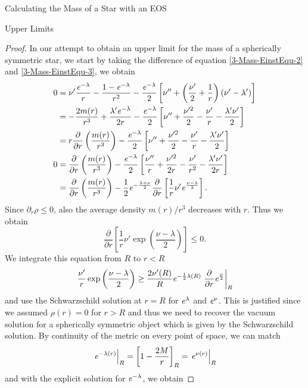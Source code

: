 \begin{section}{Calculating the Mass of a Star with an EOS}
\begin{subsection}{Upper Limits}
\begin{proof}
	In our attempt to obtain an upper limit for the mass of a spherically symmetric star, we start by taking the difference of equation \eqref{3-Mass-EinstEqu-2} and \eqref{3-Mass-EinstEqu-3}, we obtain 
	\begin{align}
		0 &= \nu'\frac{\mathit{e}^{-\lambda}}{r} - \frac{1-\mathit{e}^{-\lambda}}{r^2} - \frac{\mathit{e}^{-\lambda}}{2}\left[\nu''+\left(\frac{\nu'}{2} + \frac{1}{r}\right)\left(\nu'-\lambda'\right) \right]\\
		&= - \frac{2m(r)}{r^3} + \frac{\lambda'\mathit{e}^{-\lambda}}{2r} -  \frac{\mathit{e}^{-\lambda}}{2}\left[\nu''+ \frac{\nu'^2}{2} - \frac{\nu'}{r} -\frac{\lambda'\nu'}{2}\right]\\
		&= r\frac{\partial}{\partial r}\left(\frac{m(r)}{r^3}\right) - \frac{\mathit{e}^{-\lambda}}{2}\left[\nu''+ \frac{\nu'^2}{2} - \frac{\nu'}{r} -\frac{\lambda'\nu'}{2}\right]\\
		0 &= \frac{\partial}{\partial r}\left(\frac{m(r)}{r^3}\right) - \frac{\mathit{e}^{-\lambda}}{2}\left[\frac{\nu''}{r}+ \frac{\nu'^2}{2r} - \frac{\nu'}{r^2} -\frac{\lambda'\nu'}{2r}\right]\\
		&= \frac{\partial}{\partial r}\left(\frac{m(r)}{r^3}\right) - \frac{1}{2}\mathit{e}^{-\frac{\lambda+\nu}{2}}\frac{\partial}{\partial r}\left[\frac{1}{r}\nu'\mathit{e}^{\frac{\nu-\lambda}{2}}\right].
	\end{align}
	Since $\partial_r\rho\leq0$, also the average density $m(r)/r^3$ decreases with $r$. Thus we obtain
	\begin{equation}
		\frac{\partial}{\partial r}\left[\frac{1}{r}\nu'\exp\left(\frac{\nu-\lambda}{2}\right) \right] \leq 0.
	\end{equation}
	We integrate this equation from $R$ to $r<R$
	\begin{equation}
		\frac{\nu'}{r}\exp\left(\frac{\nu-\lambda}{2}\right)\geq\frac{2\nu'(R)}{R}\mathit{e}^{-\frac{1}{2}\lambda(R)}\left.\frac{\partial}{\partial r}\mathit{e}^{\frac{\nu}{2}}\right|_R
	\end{equation}
	and use the Schwarzschild solution at $r=R$ for $\mathit{e}^\lambda$ and $\mathit{e}^\nu$. This is justified since we assumed $\rho(r)=0$ for $r>R$ and thus we need to recover the vacuum solution for a spherically symmetric object which is given by the Schwarzschild solution. By continuity of the metric on every point of space, we can match 
	\begin{equation}
		\left.\mathit{e}^{-\lambda(r)}\right|_R=\left[1-\frac{2M}{r}\right]_R=\left.\mathit{e}^{\nu(r)}\right|_R
		\label{3-Mass-MassLimitApprox1}
	\end{equation}
	and with the explicit solution for $\mathit{e}^{-\lambda}$, we obtain

\end{proof}
\end{subsection}
\end{section}
